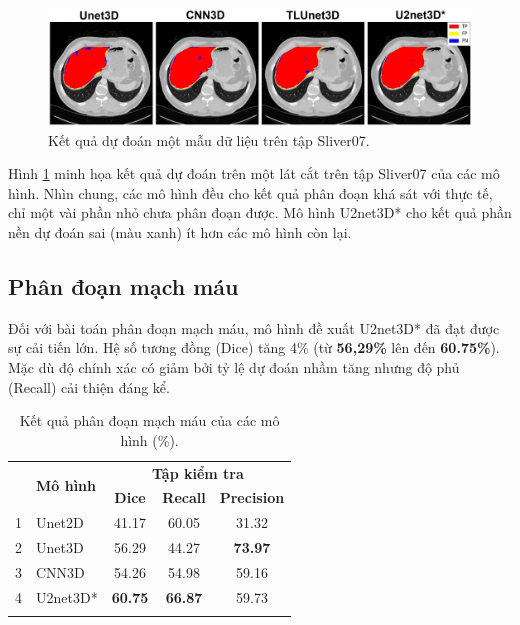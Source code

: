 \begin{figure}[H]
    \centering
    \includegraphics[width=\textwidth]{images/liver/U2Net3D/liver-result-legend.jpg}
    \caption{Kết quả dự đoán một mẫu dữ liệu trên tập Sliver07.}
    \label{fig:u2net3d-liver-result}
\end{figure}
\vspace{-5mm}
Hình \ref{fig:u2net3d-liver-result} minh họa kết quả dự đoán trên một lát cắt trên tập Sliver07 của các mô hình. Nhìn chung, các mô hình đều cho kết quả phân đoạn khá sát với thực tế, chỉ một vài phần nhỏ chưa phân đoạn được. Mô hình U2net3D* cho kết quả phần nền dự đoán sai (màu xanh) ít hơn các mô hình còn lại.
\subsection{Phân đoạn mạch máu}
Đối với bài toán phân đoạn mạch máu, mô hình đề xuất U2net3D* đã đạt được sự cải tiến lớn. Hệ số tương đồng (Dice) tăng 4\% (từ \textbf{ 56,29\%} lên đến \textbf{60.75\%}). Mặc dù độ chính xác có giảm bởi tỷ lệ dự đoán nhầm tăng nhưng độ phủ (Recall) cải thiện đáng kể.

\begin{table}[H]
    \renewcommand{\arraystretch}{1.1}
    \centering
    \begin{tabular}{c l c c c}
        \Xhline{2\arrayrulewidth}
        \multirow{2}{*}{\textbf{STT}} & \multirow{2}{*}{\textbf{Mô hình}} & \multicolumn{3}{c}{\textbf{Tập kiểm tra}} \\ \cline{3-5}
        & &  \textbf{Dice} & \textbf{Recall} & \textbf{Precision} \\ 
        \Xhline{2\arrayrulewidth}
        1   & Unet2D\cite{Unet}      & 41.17 & 60.05 & 31.32\\
        2   & Unet3D\cite{LV_LIVER}       & 56.29 & 44.27 & \textbf{73.97} \\
        3   & CNN3D\cite{LV_VESEL}        & 54.26 & 54.98 & 59.16 \\
        4   & U2net3D*     & \textbf{60.75} & \textbf{66.87} & 59.73 \\
        \Xhline{2\arrayrulewidth}
    \end{tabular}
    \caption{Kết quả phân đoạn mạch máu của các mô hình (\%).}
\end{table}

